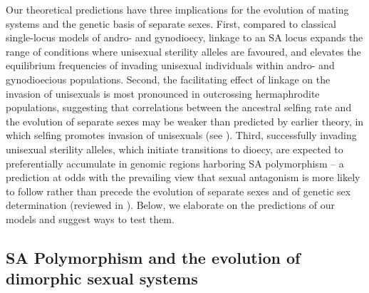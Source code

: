 \documentclass{article}
\newcommand\hl[1]{%
  \bgroup
  \hskip0pt\color{blue!80!black}%
  #1%
  \egroup
}
\begin{document}
Our theoretical predictions have three implications for the evolution of mating systems and the genetic basis of separate sexes. First, compared to classical single-locus models of andro- and gynodioecy, linkage to an SA locus expands the range of conditions where unisexual sterility alleles are favoured, and elevates the equilibrium frequencies of invading unisexual individuals within andro- and gynodioecious populations. Second, the facilitating effect of linkage on the invasion of unisexuals is most pronounced in outcrossing hermaphrodite populations, suggesting that correlations between the ancestral selfing rate and the evolution of separate sexes may be weaker than predicted by earlier theory, in which selfing promotes invasion of unisexuals (see \citealt{Charlesworth1978a}). Third, successfully invading unisexual sterility alleles, which initiate transitions to dioecy, are expected to preferentially accumulate in genomic regions harboring SA polymorphism -- a prediction at odds with the prevailing view that sexual antagonism is more likely to follow rather than precede the evolution of separate sexes and of genetic sex determination (reviewed in \citealt{CharlesworthEtAl2005,Bachtrog2006}). Below, we elaborate on the predictions of our models and suggest ways to test them.

\subsection*{SA Polymorphism and the evolution of dimorphic sexual systems} 

\end{document}
